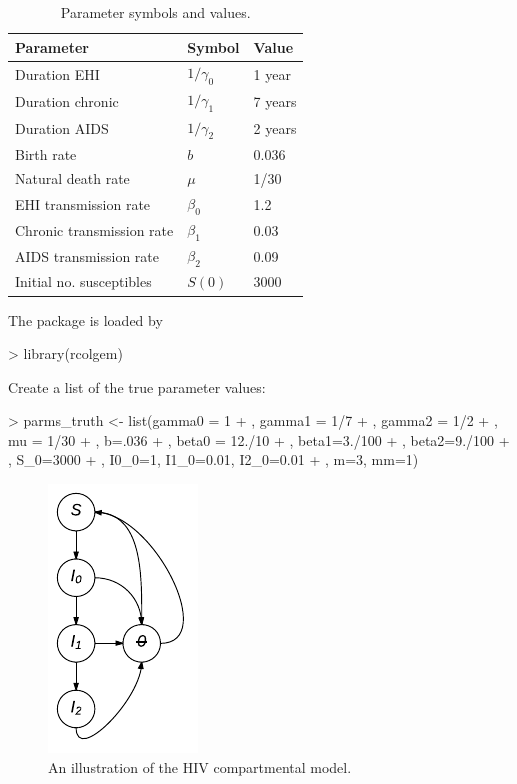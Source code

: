 \documentclass{article}
\begin{document}
\begin{table}
\caption{ Parameter symbols and values. \label{tab:parms} }
\begin{center}
	\begin{tabular}{lll}
		\hline 
		Parameter & Symbol & Value \\
		\hline
		Duration EHI & $1/\gamma_0$ & 1 year \\
		Duration chronic & $1/\gamma_1$ & 7 years \\
		Duration AIDS & $1/\gamma_2$  & 2 years \\
		Birth rate & $b$ & 0.036 \\
		Natural death rate & $\mu$ &  1/30 \\
		EHI transmission rate & $\beta_0$ & 1.2 \\
		Chronic transmission rate & $\beta_1$ & 0.03 \\
		AIDS transmission rate  &  $\beta_2$ & 0.09 \\
		Initial no. susceptibles & $S(0)$ & 3000 \\
		\hline 
	\end{tabular}
\end{center}
\end{table}

The package is loaded by
\begin{Schunk}
\begin{Sinput}
> library(rcolgem)
\end{Sinput}
\end{Schunk}

Create a list of the true parameter values: 
\begin{Schunk}
\begin{Sinput}
> parms_truth <- list(gamma0 = 1
+  , gamma1 = 1/7
+  , gamma2 = 1/2
+  , mu = 1/30
+  , b=.036
+  , beta0 = 12./10
+  , beta1=3./100
+  , beta2=9./100
+  , S_0=3000
+  , I0_0=1, I1_0=0.01, I2_0=0.01
+  , m=3, mm=1) 
\end{Sinput}
\end{Schunk}

\begin{figure}
\begin{center}
	\includegraphics[width=.4\textwidth]{figure/siiirs.pdf}
\end{center}
	\caption{ An illustration of the HIV compartmental model. \label{fig:hivmodel}}
\end{figure}
\end{document}
